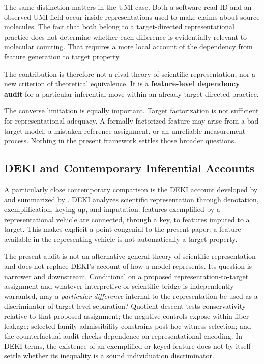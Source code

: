 \documentclass[11pt]{article}
\begin{document}
The same distinction matters in the UMI case. Both a software read ID and an observed UMI field occur inside representations used to make claims about source molecules. The fact that both belong to a target-directed representational practice does not determine whether each difference is evidentially relevant to molecular counting. That requires a more local account of the dependency from feature generation to target property.

The contribution is therefore not a rival theory of scientific representation, nor a new criterion of theoretical equivalence. It is a \textbf{feature-level dependency audit} for a particular inferential move within an already target-directed practice.

The converse limitation is equally important. Target factorization is not sufficient for representational adequacy. A formally factorized feature may arise from a bad target model, a mistaken reference assignment, or an unreliable measurement process. Nothing in the present framework settles those broader questions.

\subsection{DEKI and Contemporary Inferential Accounts}

A particularly close contemporary comparison is the DEKI account developed by \citet{FriggNguyen2020ModellingNature} and summarized by \citet{NguyenFrigg2022ScientificRepresentation}. DEKI analyzes scientific representation through denotation, exemplification, keying-up, and imputation: features exemplified by a representational vehicle are connected, through a key, to features imputed to a target. This makes explicit a point congenial to the present paper: a feature available in the representing vehicle is not automatically a target property.

The present audit is not an alternative general theory of scientific representation and does not replace DEKI's account of how a model represents. Its question is narrower and downstream. Conditional on a proposed representation-to-target assignment and whatever interpretive or scientific bridge is independently warranted, may a \emph{particular difference} internal to the representation be used as a discriminator of target-level separation? Quotient descent tests conservativity relative to that proposed assignment; the negative controls expose within-fiber leakage; selected-family admissibility constrains post-hoc witness selection; and the counterfactual audit checks dependence on representational encoding. In DEKI terms, the existence of an exemplified or keyed feature does not by itself settle whether its inequality is a sound individuation discriminator.
\end{document}
